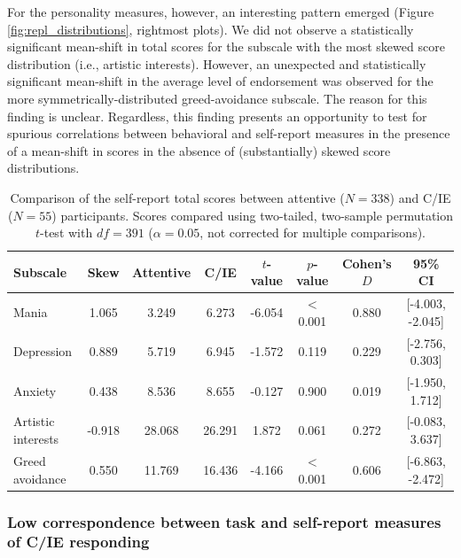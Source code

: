 \documentclass[a4paper,notitlepage,12pt]{article}
\begin{document}
For the personality measures, however, an interesting pattern emerged (Figure \ref{fig:repl_distributions}, rightmost plots). We did not observe a statistically significant mean-shift in total scores for the subscale with the most skewed score distribution (i.e., artistic interests). However, an unexpected and statistically significant mean-shift in the average level of endorsement was observed for the more symmetrically-distributed greed-avoidance subscale. The reason for this finding is unclear. Regardless, this finding presents an opportunity to test for spurious correlations between behavioral and self-report measures in the presence of a mean-shift in scores in the absence of (substantially) skewed score distributions. 

\begin{table}[!t]
    \centering
    \small
    \begin{tabular}{lccccccc}
        \toprule
        Subscale & Skew &  Attentive & C/IE & $t$-value & $p$-value & Cohen's $D$ & 95\% CI \\
        \midrule
        Mania                &  1.065 &      3.249 &   6.273 & -6.054 &  $<$0.001 &  0.880 &  [-4.003, -2.045] \\
        Depression           &  0.889 &      5.719 &   6.945 & -1.572 &  0.119 &  0.229 &   [-2.756, 0.303] \\
        Anxiety              &  0.438 &      8.536 &   8.655 & -0.127 &  0.900 &  0.019 &   [-1.950, 1.712] \\
        Artistic interests   & -0.918 &     28.068 &  26.291 &  1.872 &  0.061 &  0.272 &   [-0.083, 3.637] \\
        Greed avoidance      &  0.550 &     11.769 &  16.436 & -4.166 &  $<$0.001 &  0.606 &  [-6.863, -2.472] \\
        \bottomrule
    \end{tabular}
    \caption{Comparison of the self-report total scores between attentive ($N=338$) and C/IE ($N=55$) participants. Scores compared using two-tailed, two-sample permutation $t$-test with $df=391$ ($\alpha = 0.05$, not corrected for multiple comparisons).}    
    \label{tab:rep_validation}
\end{table}

\subsubsection*{Low correspondence between task and self-report measures of C/IE responding}
\end{document}
